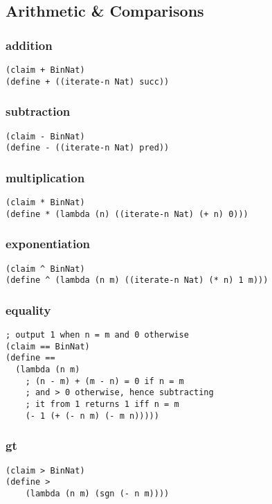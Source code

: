 \subsection{Arithmetic \& Comparisons}

\subsubsection{addition} \label{code:addition}
\begin{lstlisting}
(claim + BinNat)
(define + ((iterate-n Nat) succ))
\end{lstlisting}

\subsubsection{subtraction} \label{code:subtraction}
\begin{lstlisting}
(claim - BinNat)
(define - ((iterate-n Nat) pred))
\end{lstlisting}

\subsubsection{multiplication} \label{code:multiplication}
\begin{lstlisting}
(claim * BinNat)
(define * (lambda (n) ((iterate-n Nat) (+ n) 0)))
\end{lstlisting}

\subsubsection{exponentiation} \label{code:exponentiation}
\begin{lstlisting}
(claim ^ BinNat)
(define ^ (lambda (n m) ((iterate-n Nat) (* n) 1 m)))
\end{lstlisting}

\subsubsection{equality} \label{code:equality}
\begin{lstlisting}
; output 1 when n = m and 0 otherwise
(claim == BinNat)
(define ==
  (lambda (n m)
    ; (n - m) + (m - n) = 0 if n = m
    ; and > 0 otherwise, hence subtracting
    ; it from 1 returns 1 iff n = m
    (- 1 (+ (- n m) (- m n)))))
\end{lstlisting}

\subsubsection{gt} \label{code:gt}
\begin{lstlisting}
(claim > BinNat)
(define >
    (lambda (n m) (sgn (- n m))))
\end{lstlisting}

